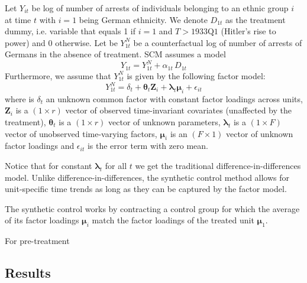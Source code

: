 Let $Y_{it}$ be log of number of arrests of individuals belonging to an ethnic group $i$ at time $t$ with $i = 1$ being German ethnicity.  We
denote $D_{1t}$ as the treatment dummy, i.e. variable that equals 1 if $i = 1$ and $T > \text{1933Q1}$ (Hitler's rise to power) and 0 otherwise. 
Let be $Y_{1t}^N$ be a counterfactual log of number of arrests of Germans in the absence of treatment. SCM assumes a model
\begin{equation}
    Y_{1t} = Y_{1t}^N + \alpha_{1t} \, D_{1t}
\end{equation}
Furthermore, we assume that $Y_{1t}^N$ is given by the following factor model:
\begin{equation}
   Y_{1t}^N = \delta_t + \boldsymbol{\theta}_t \boldsymbol{Z}_i +
   \boldsymbol{\lambda}_t \boldsymbol{\mu}_i + \epsilon_{it}
\end{equation}
where is $\delta_t$ an unknown common factor with constant factor
loadings across units, $\boldsymbol{Z}_i$ is a
$(1 \times r)$ vector of observed time-invariant covariates (unaffected by the treatment),  $\boldsymbol{\theta}_t$ is a $(1 \times r)$ vector of
unknown parameters, $\boldsymbol{\lambda}_t$ is a $(1 \times F)$ vector of unobserved time-varying factors, $\boldsymbol{\mu}_i$ is an $(F \times 1)$ vector of unknown factor loadings
and $\epsilon_{it}$ is the error term with zero mean. 

Notice that for constant  $\boldsymbol{\lambda}_t$ for all $t$ we get the traditional  difference-in-differences model. Unlike difference-in-differences,  the synthetic control method  allows for unit-specific time trends as long as they can be captured by the factor model. 

The synthetic control works by contracting a control group for which the average of its factor loadings $\boldsymbol{\mu}_i$ match the factor loadings of the treated unit  $\boldsymbol{\mu}_1$.

For pre-treatment

\subsection{Results}


